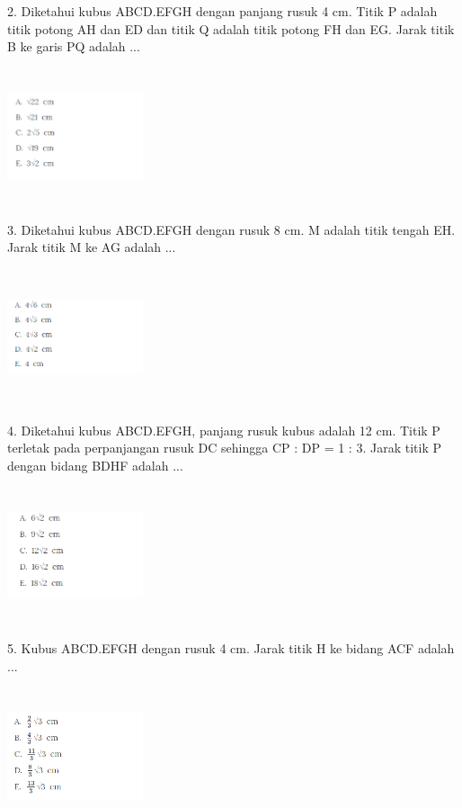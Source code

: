 \documentclass[11pt,fleqn]{book} %
\begin{document}
2. Diketahui kubus ABCD.EFGH dengan panjang rusuk 4 cm. Titik P adalah titik potong AH dan ED dan titik Q adalah titik potong FH dan EG. Jarak titik B ke garis PQ adalah ...

\includegraphics[width = 4cm, height= 4cm]{Pictures/gi30.png}


3. Diketahui kubus ABCD.EFGH dengan rusuk 8 cm. M adalah titik tengah EH. Jarak titik M ke AG adalah ...

\includegraphics[width = 4cm, height= 4cm]{Pictures/gi31.png}

4. Diketahui kubus ABCD.EFGH, panjang rusuk kubus adalah 12 cm. Titik P terletak pada perpanjangan rusuk DC sehingga CP : DP = 1 : 3. Jarak titik P dengan bidang BDHF adalah ...

\includegraphics[width = 4cm, height= 4cm]{Pictures/gi32.png}

5. Kubus ABCD.EFGH dengan rusuk 4 cm. Jarak titik H ke bidang ACF adalah ...

\includegraphics[width = 4cm, height= 4cm]{Pictures/gi33.png}
\end{document}
